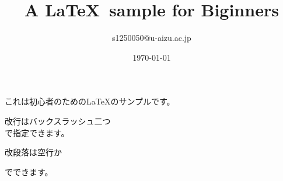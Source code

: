 \documentclass[a4paper]{jarticle}
\title{A \LaTeX ~sample for Biginners}
\author{s1250050@u-aizu.ac.jp}
\date{\today}
\begin{document}
\maketitle

これは初心者のための\LaTeX のサンプルです。

改行はバックスラッシュ二つ \\ で指定できます。

改段落は空行か \par でできます。
\end{document}
